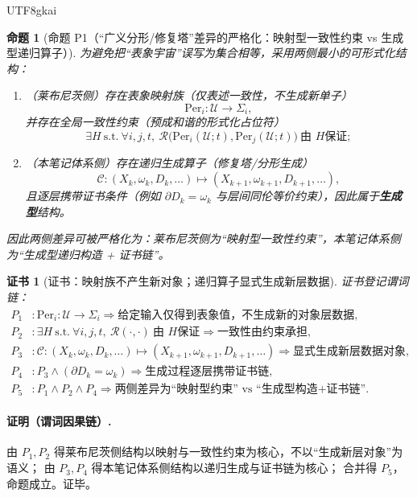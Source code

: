 \documentclass[12pt]{article}
\newtheorem{proposition}{命题}[section]
\newtheorem{Certificate}{证书}[section]
\begin{document}
\begin{CJK*}{UTF8}{gkai}
\begin{proposition}[命题 P1（“广义分形/修复塔”差异的严格化：映射型一致性约束 vs 生成型递归算子）]
\label{prop:tex29-mapping-vs-generating}
为避免把“表象宇宙”误写为集合相等，采用两侧最小的可形式化结构：
\begin{enumerate}
  \item （莱布尼茨侧）存在表象映射族（仅表述一致性，不生成新单子）
  \[
    \mathrm{Per}_i:\mathcal{U}\to \Sigma_i,
  \]
  并存在全局一致性约束（预成和谐的形式化占位符）
  \[
    \exists H\ \text{s.t.}\ \forall i,j,t,\ \mathcal{R}\bigl(\mathrm{Per}_i(\mathcal{U};t),\mathrm{Per}_j(\mathcal{U};t)
      \bigr)\ \text{由 }H\text{保证};
  \]
  \item （本笔记体系侧）存在递归生成算子（修复塔/分形生成）
  \[
    \mathcal{C}:(X_k,\omega_k,D_k,\dots)\longmapsto (X_{k+1},\omega_{k+1},D_{k+1},\dots),
  \]
  且逐层携带证书条件（例如 $\partial D_k=\omega_k$ 与层间同伦等价约束），因此属于\textbf{生成型}结构。
\end{enumerate}
因此两侧差异可被严格化为：莱布尼茨侧为“映射型一致性约束”，本笔记体系侧为“生成型递归构造 + 证书链”。
\end{proposition}

\begin{Certificate}[证书：映射族不产生新对象；递归算子显式生成新层数据]
\label{cert:tex29-mapping-vs-generating}
证书登记谓词链：
\[
\begin{aligned}
  P_1 &: \mathrm{Per}_i:\mathcal{U}\to \Sigma_i\Rightarrow \text{给定输入仅得到表象值，不生成新的对象层数据},\\
  P_2 &: \exists H\ \text{s.t.}\ \forall i,j,t,\ \mathcal{R}(\cdot,\cdot)\ \text{由 }H\text{保证}\Rightarrow \text{一致性由约束承担}
    ,\\
  P_3 &: \mathcal{C}:(X_k,\omega_k,D_k,\dots)\mapsto (X_{k+1},\omega_{k+1},D_{k+1},\dots)\Rightarrow \text{显式生成新层数据对象},
    \\
  P_4 &: P_3\wedge (\partial D_k=\omega_k)\Rightarrow \text{生成过程逐层携带证书链},\\
  P_5 &: P_1\wedge P_2\wedge P_4\Rightarrow \text{两侧差异为“映射型约束” vs “生成型构造+证书链”}.
\end{aligned}
\]
\end{Certificate}

\paragraph{证明（谓词因果链）.}
由 $P_1,P_2$ 得莱布尼茨侧结构以映射与一致性约束为核心，不以“生成新层对象”为语义；
由 $P_3,P_4$ 得本笔记体系侧结构以递归生成与证书链为核心；
合并得 $P_5$，命题成立。证毕。


\end{CJK*}
\end{document}
